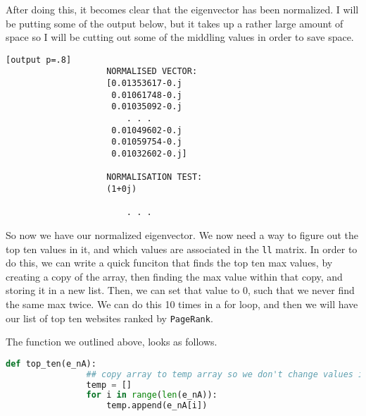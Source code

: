 \documentclass[11pt]{article}
\begin{document}
\begin{enumerate}
        After doing this, it becomes clear that the eigenvector has been
        normalized. I will be putting some of the output below, but it takes up
        a rather large amount of space so I will be cutting out some of the
        middling values in order to save space.

        \begin{minipage}[t]{.48\linewidth}            
            \begin{center}
                \begin{lstlisting}[basicstyle=\ttfamily\footnotesize, gobble=10]
                [output p=.8]
                    NORMALISED VECTOR:
                    [0.01353617-0.j 
                     0.01061748-0.j 
                     0.01035092-0.j 
                        . . .
                     0.01049602-0.j 
                     0.01059754-0.j
                     0.01032602-0.j]

                    NORMALISATION TEST:
                    (1+0j)

                        . . .
                \end{lstlisting}
            \end{center}
        \end{minipage}\hfill \vline \hfill%
        \begin{minipage}[t]{.48\linewidth}
             So now we have our normalized eigenvector. We now need a way to
             figure out the top ten values in it, and which values are
             associated in the \texttt{ll} matrix. In order to do this, we can
             write a quick funciton that finds the top ten max values, by
             creating a copy of the array, then finding the max value within
             that copy, and storing it in a new list. Then, we can set that
             value to 0, such that we never find the same max twice. We can do
             this 10 times in a for loop, and then we will have our list of top
             ten websites ranked by \texttt{PageRank}.
        \end{minipage}
        \newpage

        The function we outlined above, looks as follows.

        \begin{lstlisting}[style=mystyle, linewidth=0.94\linewidth, 
                            language=Python, gobble=8, caption=Finding the top ten]
            def top_ten(e_nA):
                ## copy array to temp array so we don't change values in eigenvector
                temp = []
                for i in range(len(e_nA)):
                    temp.append(e_nA[i])


\end{lstlisting}
\end{enumerate}
\end{document}

